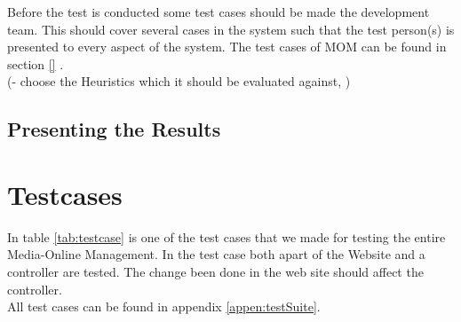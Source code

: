 Before the test is conducted some test cases should be made the development team. This should cover several cases in the system such that the test person(s) is presented to every aspect of the system. The test cases of MOM can be found in section \vref{} . \\


(- choose the Heuristics which it should be evaluated against, ) 


\subsection{Presenting the Results}

\section{Testcases}
In table \ref{tab:testcase} is one of the test cases that we made for testing the entire Media-Online Management. In the test case both apart of the Website and a controller are tested. The change been done in the web site should affect the controller.\\ 
 All test cases can be found in appendix \vref{appen:testSuite}.
